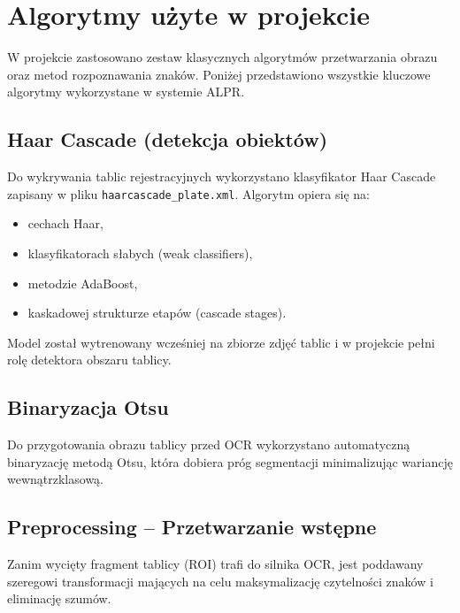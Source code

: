 \documentclass[12pt,a4paper]{article}
\begin{document}
\section{Algorytmy użyte w projekcie}

W projekcie zastosowano zestaw klasycznych algorytmów przetwarzania obrazu oraz metod rozpoznawania znaków.  
Poniżej przedstawiono wszystkie kluczowe algorytmy wykorzystane w systemie ALPR.

\subsection{Haar Cascade (detekcja obiektów)}
Do wykrywania tablic rejestracyjnych wykorzystano klasyfikator Haar Cascade zapisany w pliku 
\texttt{haarcascade\_plate.xml}.  
Algorytm opiera się na:
\begin{itemize}
    \item cechach Haar,
    \item klasyfikatorach słabych (weak classifiers),
    \item metodzie AdaBoost,
    \item kaskadowej strukturze etapów (cascade stages).
\end{itemize}
Model został wytrenowany wcześniej na zbiorze zdjęć tablic i w projekcie pełni rolę detektora obszaru tablicy.

\subsection{Binaryzacja Otsu}
Do przygotowania obrazu tablicy przed OCR wykorzystano automatyczną binaryzację metodą Otsu, która dobiera próg segmentacji minimalizując wariancję wewnątrzklasową.

\subsection{Preprocessing – Przetwarzanie wstępne} Zanim wycięty fragment tablicy (ROI) trafi do silnika OCR, jest poddawany szeregowi transformacji mających na celu maksymalizację czytelności znaków i eliminację szumów.
\end{document}
